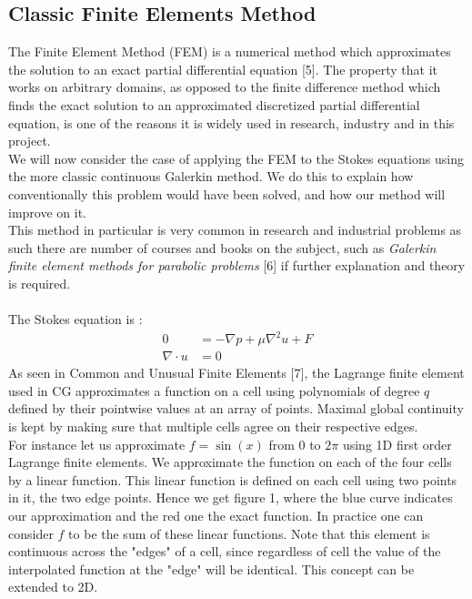 \documentclass[11pt,twoside,a4paper]{article}
\begin{document}
\subsection{Classic Finite Elements Method}
The Finite Element Method (FEM) is a numerical method which approximates the solution to an exact partial differential equation [5]. The property that it works on arbitrary domains, as opposed to the finite difference method which finds the exact solution to an approximated discretized partial differential equation, is one of the reasons it is widely used in research, industry and in this project.\\
We will now consider the case of applying the FEM to the Stokes equations using the more classic continuous Galerkin method. We do this to explain how conventionally this problem would have been solved, and how our method will improve on it.\\
This method in particular is very common in research and industrial problems as such there are number of courses and books on the subject, such as \textit{Galerkin finite element methods for parabolic problems} [6] if further explanation and theory is required.\\
\\
The Stokes equation is :
\begin{align}
0 &= -\nabla p + \mu \nabla^2 u + F \\
\nabla \cdot u &= 0
\end{align}
As seen in Common and Unusual Finite Elements [7], the Lagrange finite element used in CG approximates a function on a cell using polynomials of degree $q$ defined by their pointwise values at an array of points. Maximal global continuity is kept by making sure  that multiple cells agree on their respective edges.\\
For instance let us approximate $f = \sin(x)$ from $0$ to $2 \pi$ using 1D first order Lagrange finite elements. We approximate the function on each of the four cells by a linear function. This linear function is defined on each cell using two points in it, the two edge points. Hence we get figure 1, where the blue curve indicates our approximation and the red one the exact function. In practice one can consider $f$ to be the sum of these linear functions. Note that this element is continuous across the "edges" of a cell, since regardless of cell the value of the interpolated function at the "edge" will be identical. This concept can be extended to 2D.\\
\end{document}
